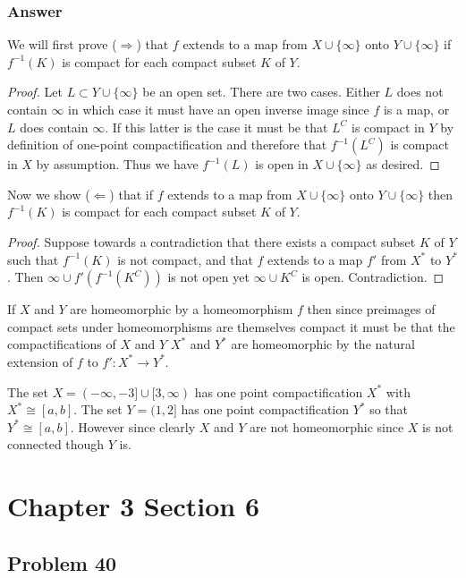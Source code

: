 \documentclass[10pt]{article}
\begin{document}
\subsubsection{Answer}
We will first prove ($\Rightarrow$) that $f$ extends to a map from $X \cup \{\infty\}$ onto $Y \cup \{ \infty\} $ if $f^{-1}(K)$ is compact for each compact subset $K$ of $Y$. 
\begin{proof}
Let $L \subset Y \cup \{\infty\}$ be an open set. There are two cases. Either $L$ does not contain $\infty$ in which case it must have an open inverse image since $f$ is a map, or $L$ does contain $\infty$.  If this latter is the case it must be that $L^C$   is compact in $Y$ by definition of one-point compactification and therefore that $f^{-1}(L^C)$ is compact in $X$ by assumption. Thus we have $f^{-1}(L)$ is open in $X \cup \{\infty\}$ as desired.
\end{proof}

Now we show  ($\Leftarrow$) that if $f$ extends to a map from $X \cup \{\infty\}$ onto $Y \cup \{ \infty\} $ then $f^{-1}(K)$ is compact for each compact subset $K$ of $Y$. 
\begin{proof}
Suppose towards a contradiction that there exists a compact subset $K$ of $Y$ such that $f^{-1}(K)$ is not compact, and that $f$ extends to a map $f'$ from $X^*$ to $Y^*$. Then $\infty \cup f'(f^{-1}(K^C))$ is not open yet $ \infty \cup K^C $ is open. Contradiction.
\end{proof}

If $X$ and $Y$ are homeomorphic by a homeomorphism $f$ then since preimages of compact sets under homeomorphisms are themselves compact it must be that the compactifications of $X$ and $Y$ $X^*$ and $Y^*$ are homeomorphic by the natural extension of $f$ to $f':X^* \to Y^*$. 

The set $X = (-\infty,-3] \cup [3,\infty)$ has one point compactification $X^*$ with $X^*\cong [a,b]$. The set $Y = (1,2]$ has one point compactification $Y^*$  so that $Y^* \cong [a,b]$. However since clearly $X$ and $Y $ are not homeomorphic since $X$ is not connected though $Y$ is.

\section{Chapter 3 Section 6}


\subsection{Problem 40}
\end{document}
